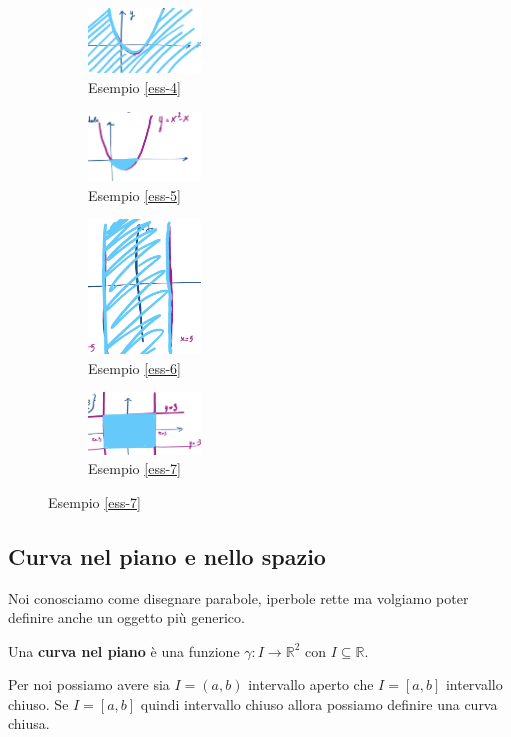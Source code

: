 \begin{figure}[h!]
\centering
\begin{subfigure}{.23\textwidth}
    \centering
    \includegraphics[width=3cm]{images/disegno-R3-ess8.png}
    \caption{Esempio \ref{ess-4}}
\end{subfigure}
\begin{subfigure}{.23\textwidth}
    \centering
    \includegraphics[width=3cm]{images/disegno-R3-ess10.png}
    \caption{Esempio \ref{ess-5}}
\end{subfigure}
\begin{subfigure}{.23\textwidth}
    \centering
    \includegraphics[width=3cm]{images/disegno-R3-ess11.png}
    \caption{Esempio \ref{ess-6}}
\end{subfigure}
\begin{subfigure}{.23\textwidth}
    \centering
    \includegraphics[width=3cm]{images/disegno-R3-ess12.png}
    \caption{Esempio \ref{ess-7}}
\end{subfigure}
\end{figure}

\subsection{Curva nel piano e nello spazio}
Noi conosciamo come disegnare parabole, iperbole rette ma volgiamo poter definire anche un oggetto più generico.
\begin{definition}
Una \textbf{curva nel piano} è una funzione $\gamma: I \to \mathbb{R}^2$ con $I \subseteq \mathbb{R}$.
\end{definition}
\hspace{-15pt}Per noi possiamo avere sia $I = (a,b)$ intervallo aperto che $I = [a,b]$ intervallo chiuso. Se $I = [a,b]$ quindi intervallo chiuso allora possiamo definire una curva chiusa.

